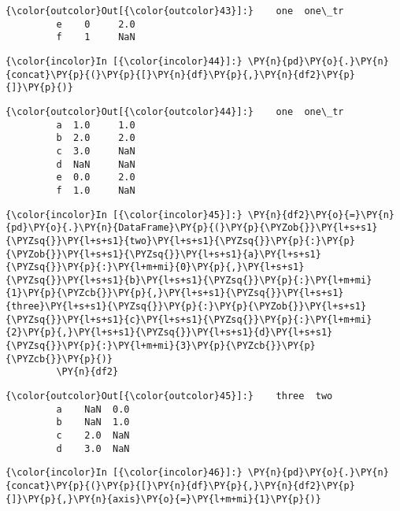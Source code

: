             \begin{Verbatim}[commandchars=\\\{\}]
{\color{outcolor}Out[{\color{outcolor}43}]:}    one  one\_tr
         e    0     2.0
         f    1     NaN
\end{Verbatim}
        
    \begin{Verbatim}[commandchars=\\\{\}]
{\color{incolor}In [{\color{incolor}44}]:} \PY{n}{pd}\PY{o}{.}\PY{n}{concat}\PY{p}{(}\PY{p}{[}\PY{n}{df}\PY{p}{,}\PY{n}{df2}\PY{p}{]}\PY{p}{)}
\end{Verbatim}

            \begin{Verbatim}[commandchars=\\\{\}]
{\color{outcolor}Out[{\color{outcolor}44}]:}    one  one\_tr
         a  1.0     1.0
         b  2.0     2.0
         c  3.0     NaN
         d  NaN     NaN
         e  0.0     2.0
         f  1.0     NaN
\end{Verbatim}
        
    \begin{Verbatim}[commandchars=\\\{\}]
{\color{incolor}In [{\color{incolor}45}]:} \PY{n}{df2}\PY{o}{=}\PY{n}{pd}\PY{o}{.}\PY{n}{DataFrame}\PY{p}{(}\PY{p}{\PYZob{}}\PY{l+s+s1}{\PYZsq{}}\PY{l+s+s1}{two}\PY{l+s+s1}{\PYZsq{}}\PY{p}{:}\PY{p}{\PYZob{}}\PY{l+s+s1}{\PYZsq{}}\PY{l+s+s1}{a}\PY{l+s+s1}{\PYZsq{}}\PY{p}{:}\PY{l+m+mi}{0}\PY{p}{,}\PY{l+s+s1}{\PYZsq{}}\PY{l+s+s1}{b}\PY{l+s+s1}{\PYZsq{}}\PY{p}{:}\PY{l+m+mi}{1}\PY{p}{\PYZcb{}}\PY{p}{,}\PY{l+s+s1}{\PYZsq{}}\PY{l+s+s1}{three}\PY{l+s+s1}{\PYZsq{}}\PY{p}{:}\PY{p}{\PYZob{}}\PY{l+s+s1}{\PYZsq{}}\PY{l+s+s1}{c}\PY{l+s+s1}{\PYZsq{}}\PY{p}{:}\PY{l+m+mi}{2}\PY{p}{,}\PY{l+s+s1}{\PYZsq{}}\PY{l+s+s1}{d}\PY{l+s+s1}{\PYZsq{}}\PY{p}{:}\PY{l+m+mi}{3}\PY{p}{\PYZcb{}}\PY{p}{\PYZcb{}}\PY{p}{)}
         \PY{n}{df2}
\end{Verbatim}

            \begin{Verbatim}[commandchars=\\\{\}]
{\color{outcolor}Out[{\color{outcolor}45}]:}    three  two
         a    NaN  0.0
         b    NaN  1.0
         c    2.0  NaN
         d    3.0  NaN
\end{Verbatim}
        
    \begin{Verbatim}[commandchars=\\\{\}]
{\color{incolor}In [{\color{incolor}46}]:} \PY{n}{pd}\PY{o}{.}\PY{n}{concat}\PY{p}{(}\PY{p}{[}\PY{n}{df}\PY{p}{,}\PY{n}{df2}\PY{p}{]}\PY{p}{,}\PY{n}{axis}\PY{o}{=}\PY{l+m+mi}{1}\PY{p}{)}
\end{Verbatim}

